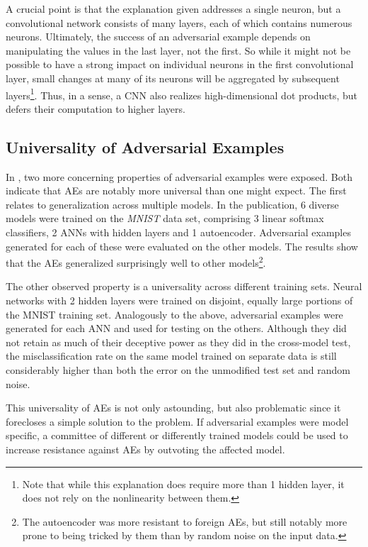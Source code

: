 \documentclass[11pt, a4paper]{article}
\begin{document}
A crucial point is that the explanation given addresses a single neuron, but a convolutional network consists of many layers, each of which contains numerous neurons. Ultimately, the success of an adversarial example depends on manipulating the values in the last layer, not the first. So while it might not be possible to have a strong impact on individual neurons in the first convolutional layer, small changes at many of its neurons will be aggregated by subsequent layers\footnote{Note that while this explanation does require more than 1 hidden layer, it does not rely on the nonlinearity between them.}. Thus, in a sense, a CNN also realizes high-dimensional dot products, but defers their computation to higher layers.

\subsection{Universality of Adversarial Examples}
In \cite{intriguing-properties-of-neural-networks}, two more concerning properties of adversarial examples were exposed. Both indicate that AEs are notably more universal than one might expect. The first relates to generalization across multiple models. In the publication, 6 diverse models were trained on the \emph{MNIST} data set, comprising 3 linear softmax classifiers, 2 ANNs with hidden layers and 1 autoencoder. Adversarial examples generated for each of these were evaluated on the other models. The results show that the AEs generalized surprisingly well to other models\footnote{The autoencoder was more resistant to foreign AEs, but still notably more prone to being tricked by them than by random noise on the input data.}.

The other observed property is a universality across different training sets. Neural networks with 2 hidden layers were trained on disjoint, equally large portions of the MNIST training set. Analogously to the above, adversarial examples were generated for each ANN and used for testing on the others. Although they did not retain as much of their deceptive power as they did in the cross-model test, the misclassification rate on the same model trained on separate data is still considerably higher than both the error on the unmodified test set and random noise.

This universality of AEs is not only astounding, but also problematic since it forecloses a simple solution to the problem. If adversarial examples were model specific, a committee of different or differently trained models could be used to increase resistance against AEs by outvoting the affected model.
\end{document}
